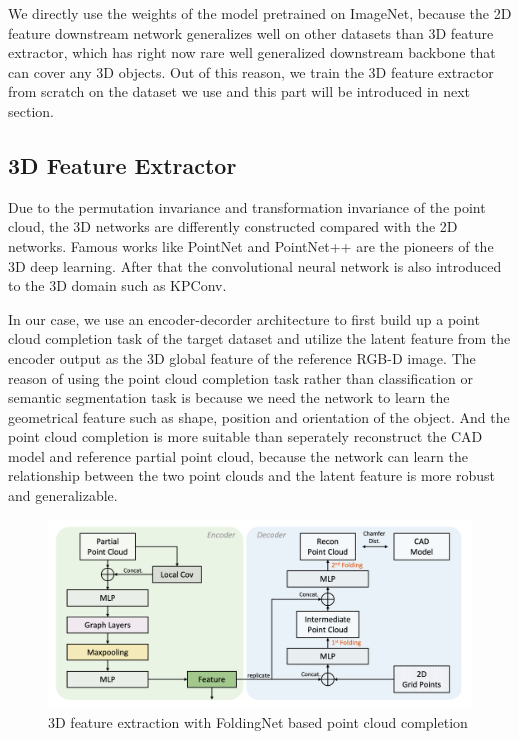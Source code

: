 \documentclass[12pt,DIV14,BCOR12mm,a4paper,footinclude=false,headinclude,parskip=half-,twoside,openright,cleardoublepage=empty,toc=index,bibliography=totoc,listof=totoc]{scrreprt}
\numberwithin{equation}{chapter}
\begin{document}
We directly use the weights of the model pretrained on ImageNet\cite{5206848}, because the 2D feature downstream network generalizes well on other datasets than 3D feature extractor, which has right now rare well generalized downstream backbone that can cover any 3D objects. Out of this reason, we train the 3D feature extractor from scratch on the dataset we use and this part will be introduced in next section.

\subsection{3D Feature Extractor}
Due to the permutation invariance and transformation invariance of the point cloud, the 3D networks are differently constructed compared with the 2D networks. Famous works like PointNet\cite{qi2017pointnet} and PointNet++\cite{qi2017pointnet++} are the pioneers of the 3D deep learning. After that the convolutional neural network is also introduced to the 3D domain such as KPConv\cite{thomas2019kpconv}. 

In our case, we use an encoder-decorder architecture to first build up a point cloud completion task of the target dataset and utilize the latent feature from the encoder output as the 3D global feature of the reference RGB-D image. The reason of using the point cloud completion task rather than classification or semantic segmentation task is because we need the network to learn the geometrical feature such as shape, position and orientation of the object. And the point cloud completion is more suitable than seperately reconstruct the CAD model and reference partial point cloud, because the network can learn the relationship between the two point clouds and the latent feature is more robust and generalizable.
\begin{figure}[h]
	\centering
	\includegraphics[scale=.2]{img/fold.png}
	\caption{3D feature extraction with FoldingNet based point cloud completion}
	\label{img:fold}
\end{figure}
\end{document}
